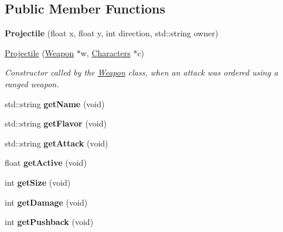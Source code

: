 \subsection*{Public Member Functions}
\begin{DoxyCompactItemize}
\item 
\hypertarget{class_projectile_aa77304b2b631673899c673ea5ff660bd}{{\bfseries Projectile} (float x, float y, int direction, std\-::string owner)}\label{class_projectile_aa77304b2b631673899c673ea5ff660bd}

\item 
\hyperlink{class_projectile_a2131209b192886d9be4fcabe3511a1d3}{Projectile} (\hyperlink{class_weapon}{Weapon} $\ast$w, \hyperlink{class_characters}{Characters} $\ast$c)
\begin{DoxyCompactList}\small\item\em Constructor called by the \hyperlink{class_weapon}{Weapon} class, when an attack was ordered using a ranged weapon. \end{DoxyCompactList}\item 
\hypertarget{class_projectile_ace3baa31fb47d65321b3091e55ea0214}{std\-::string {\bfseries get\-Name} (void)}\label{class_projectile_ace3baa31fb47d65321b3091e55ea0214}

\item 
\hypertarget{class_projectile_a259c762588761610eb08f4590409be47}{std\-::string {\bfseries get\-Flavor} (void)}\label{class_projectile_a259c762588761610eb08f4590409be47}

\item 
\hypertarget{class_projectile_a3d296e98b7227371fdfcfd9fef8bf505}{std\-::string {\bfseries get\-Attack} (void)}\label{class_projectile_a3d296e98b7227371fdfcfd9fef8bf505}

\item 
\hypertarget{class_projectile_a2342bda48bea3511d0b97f5cba7b095f}{float {\bfseries get\-Active} (void)}\label{class_projectile_a2342bda48bea3511d0b97f5cba7b095f}

\item 
\hypertarget{class_projectile_a284ae1c52821f8a9bd5972793eb210d8}{int {\bfseries get\-Size} (void)}\label{class_projectile_a284ae1c52821f8a9bd5972793eb210d8}

\item 
\hypertarget{class_projectile_ab86af40b130ac18871e9a4baec80dc85}{int {\bfseries get\-Damage} (void)}\label{class_projectile_ab86af40b130ac18871e9a4baec80dc85}

\item 
\hypertarget{class_projectile_ad54c17a658890109a332e643bb8446f2}{int {\bfseries get\-Pushback} (void)}\label{class_projectile_ad54c17a658890109a332e643bb8446f2}


\end{DoxyCompactItemize}
